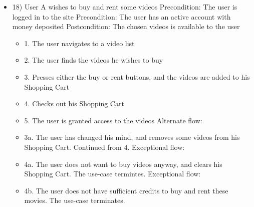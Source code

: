 \begin{itemize}
\item 18)
User A wishes to buy and rent some videos
\newline Precondition: The user is logged in to the site
\newline Precondition: The user has an active account with money deposited
\newline Postcondition: The chosen videos is available to the user
\begin{itemize}
    \item 1. The user navigates to a video list
	\item 2. The user finds the videos he wishes to buy
    \item 3. Presses either the buy or rent buttons, and the videos are added to his Shopping Cart
    \item 4. Checks out his Shopping Cart
    \item 5. The user is granted access to the videos
\newline Alternate flow:
    \item 3a. The user has changed his mind, and removes some videos from his Shopping Cart. Continued from 4.
\newline Exceptional flow:
    \item 4a. The user does not want to buy videos anyway, and clears his Shopping Cart. The use-case termintes.
\newline Exceptional flow:
    \item 4b. The user does not have sufficient credits to buy and rent these movies. The use-case terminates.
\end{itemize}

\end{itemize}
